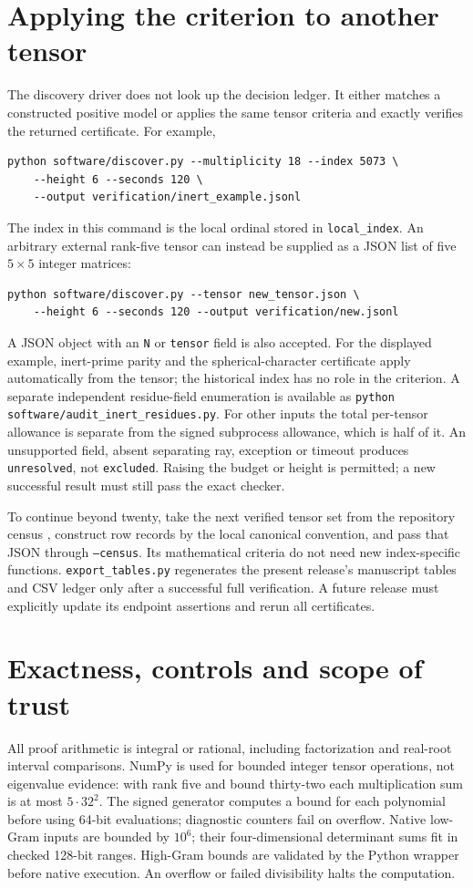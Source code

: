 \documentclass[11pt]{article}
\begin{document}
\section{Applying the criterion to another tensor}
The discovery driver does not look up the decision ledger. It either
matches a constructed positive model or applies the same tensor criteria
and exactly verifies the returned certificate. For example,
\begin{verbatim}
python software/discover.py --multiplicity 18 --index 5073 \
    --height 6 --seconds 120 \
    --output verification/inert_example.jsonl
\end{verbatim}
The index in this command is the local ordinal stored in
\texttt{local\_index}. An arbitrary
external rank-five tensor can instead be supplied as a JSON list of
five $5\times5$ integer matrices:
\begin{verbatim}
python software/discover.py --tensor new_tensor.json \
    --height 6 --seconds 120 --output verification/new.jsonl
\end{verbatim}
A JSON object with an \texttt{N} or \texttt{tensor} field is also accepted.
For the displayed example, inert-prime parity and the spherical-character
certificate apply automatically from the tensor; the historical index
has no role in the criterion. A separate independent residue-field
enumeration is available as
\texttt{python software/audit\_inert\_residues.py}.
For other inputs the total per-tensor allowance is separate from the signed subprocess
allowance, which is half of it. An unsupported field, absent separating
ray, exception or timeout produces \texttt{unresolved}, not
\texttt{excluded}. Raising the budget or height is permitted; a new
successful result must still pass the exact checker.

To continue beyond twenty, take the next verified tensor set from the
repository census \cite{Census}, construct row records by the local
canonical convention, and pass that JSON through \texttt{--census}. Its mathematical criteria
do not need new index-specific functions. \texttt{export\_tables.py}
regenerates the present release's manuscript tables and CSV ledger only
after a successful full verification. A future release must explicitly
update its endpoint assertions and rerun all certificates.

\section{Exactness, controls and scope of trust}
All proof arithmetic is integral or rational, including factorization
and real-root interval comparisons. NumPy is used for bounded integer
tensor operations, not eigenvalue evidence: with rank five and bound
thirty-two each multiplication sum is at most $5\cdot32^2$.
The signed generator computes a bound for each polynomial before using
64-bit evaluations; diagnostic counters fail on overflow.
Native low-Gram inputs are bounded by $10^6$; their
four-dimensional determinant sums fit in checked 128-bit ranges.
High-Gram bounds are validated by the Python wrapper before native
execution. An overflow or failed divisibility halts the computation.
\end{document}
